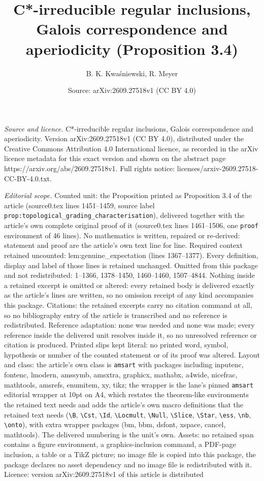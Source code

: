 \documentclass[10pt,a4paper]{amsart}
\title[C*-irreducible regular inclusions, Galois correspondence and]{C*-irreducible regular inclusions, Galois correspondence and aperiodicity (Proposition 3.4)}
\author{B. K. Kwa\'sniewski, R. Meyer}
\date{Source: arXiv:2609.27518v1 (CC BY 4.0)}
\begin{document}
\maketitle

\noindent\emph{Source and licence.} C*-irreducible regular inclusions, Galois correspondence and aperiodicity. Version arXiv:2609.27518v1 (CC BY 4.0), distributed under the Creative Commons Attribution 4.0 International licence, as recorded in the arXiv licence metadata for this exact version and shown on the abstract page https://arxiv.org/abs/2609.27518v1. Full rights notice: licenses/arxiv-2609.27518-CC-BY-4.0.txt.\par\smallskip

\noindent\textit{Editorial scope.} Counted unit: the Proposition printed as Proposition 3.4 of the article (source0.tex lines 1451--1459, source label \texttt{prop:topological\_grading\_characterisation}), delivered together with the article's own complete original proof of it (source0.tex lines 1461--1506, one \texttt{proof} environment of 46 lines). No mathematics is written, repaired or re-derived: statement and proof are the article's own text line for line. Required context retained uncounted: lem:genuine\_expectation (lines 1367--1377). Every definition, display and label of those lines is retained unchanged. Omitted from this package and not redistributed: 1--1366, 1378--1450, 1460--1460, 1507--4844. Nothing inside a retained excerpt is omitted or altered: every retained body is delivered exactly as the article's lines are written, so no omission receipt of any kind accompanies this package. Citations: the retained excerpts carry no citation command at all, so no bibliography entry of the article is transcribed and no reference is redistributed. Reference adaptation: none was needed and none was made; every reference inside the delivered unit resolves inside it, so no unresolved reference or citation is produced. Printed slips kept literal: no printed word, symbol, hypothesis or number of the counted statement or of its proof was altered. Layout and class: the article's own class is \texttt{amsart} with packages including inputenc, fontenc, lmodern, amssymb, amsxtra, graphicx, mathabx, a4wide, nicefrac, mathtools, amsrefs, enumitem, xy, tikz; the wrapper is the lane's pinned \texttt{amsart} editorial wrapper at 10pt on A4, which restates the theorem-like environments the retained text needs and adds the article's own macro definitions that the retained text needs (\texttt{\textbackslash B}, \texttt{\textbackslash Cst}, \texttt{\textbackslash Id}, \texttt{\textbackslash Locmult}, \texttt{\textbackslash Null}, \texttt{\textbackslash Slice}, \texttt{\textbackslash Star}, \texttt{\textbackslash ess}, \texttt{\textbackslash nb}, \texttt{\textbackslash onto}), with extra wrapper packages (bm, bbm, dsfont, xspace, cancel, mathtools). The delivered numbering is the unit's own. Assets: no retained span contains a figure environment, a graphics-inclusion command, a PDF-page inclusion, a table or a TikZ picture; no image file is copied into this package, the package declares no asset dependency and no image file is redistributed with it. Licence: version arXiv:2609.27518v1 of this article is distributed 
\end{document}
